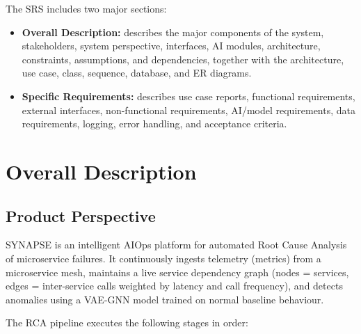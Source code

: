\documentclass[11pt,a4paper]{article}
\begin{document}
The SRS includes two major sections:

\begin{itemize}
    \item \textbf{Overall Description:} describes the major components of the system, stakeholders, system perspective, interfaces, AI modules, architecture, constraints, assumptions, and dependencies, together with the architecture, use case, class, sequence, database, and ER diagrams.
    \item \textbf{Specific Requirements:} describes use case reports, functional requirements, external interfaces, non-functional requirements, AI/model requirements, data requirements, logging, error handling, and acceptance criteria.
\end{itemize}


\section{Overall Description}

\subsection{Product Perspective}

SYNAPSE is an intelligent AIOps platform for automated Root Cause Analysis of microservice failures. It continuously ingests telemetry (metrics) from a microservice mesh, maintains a live service dependency graph (nodes = services, edges = inter-service calls weighted by latency and call frequency), and detects anomalies using a VAE-GNN model trained on normal baseline behaviour.

The RCA pipeline executes the following stages in order:
\end{document}

